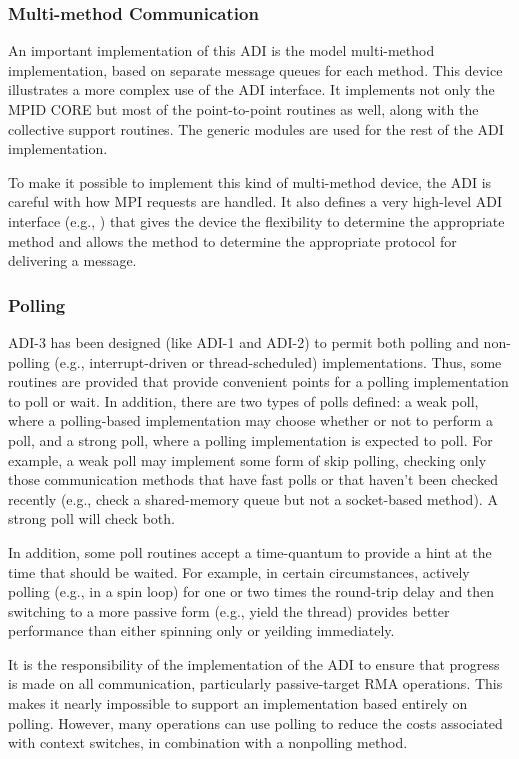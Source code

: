 \documentclass[dvipdfm]{article}
\begin{document}
\subsubsection{Multi-method Communication}
An important implementation of this ADI is the model multi-method
implementation, based on separate message queues for each method.
This device illustrates a more complex use of the ADI interface.  It
implements not only the MPID CORE but most of the point-to-point
routines as well, along with the collective support routines.  The
generic modules are used for the rest of the ADI implementation.

To make it possible to implement this kind of multi-method device, the
ADI is careful with how MPI requests are handled.  It also defines a
very high-level ADI interface (e.g., ) that gives the
device the flexibility to determine the appropriate method and allows
the method to determine the appropriate protocol for delivering a message.

\subsubsection{Polling}
ADI-3 has been designed (like ADI-1 and ADI-2) to permit both polling and
non-polling (e.g., interrupt-driven or thread-scheduled) implementations.
Thus, some routines are provided that provide convenient points for a polling
implementation to poll or wait.  In addition, there are two types of
polls defined: a weak poll, where a polling-based implementation may
choose whether or not to perform a poll, and a strong poll, where a
polling implementation is expected to poll.  For example, a weak poll
may implement some form of skip polling, checking only those
communication methods that have fast polls or that haven't been
checked recently (e.g., check a shared-memory queue but not a
socket-based method).  A strong poll will check both.

In addition, some poll routines accept a time-quantum to provide a
hint at the time that should be waited.  For example, in certain
circumstances, actively polling (e.g., in a spin loop) for one or two
times the round-trip delay and then switching to a more passive form
(e.g., yield the thread) provides better performance than either
spinning only or yeilding immediately.


It is the responsibility of the implementation of the ADI to ensure that
progress is made on all communication, particularly passive-target RMA
operations.  This makes it nearly impossible to support an implementation
based entirely on polling.  However, many operations can use polling to reduce
the costs associated with context switches, in combination with a nonpolling
method.
\end{document}
